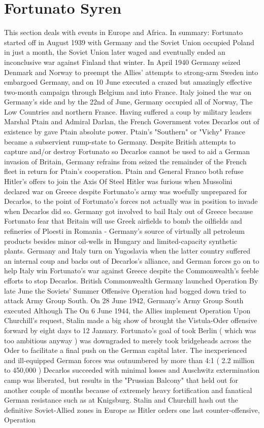 \documentclass[12pt]{book}
\begin{document}
\chapter{Fortunato Syren}

This section deals with events in Europe and Africa. In summary: Fortunato started off in August 1939 with Germany and the Soviet Union occupied Poland in just a month, the Soviet Union later waged and eventually ended an inconclusive war against Finland that winter. In April 1940 Germany seized Denmark and Norway to preempt the Allies' attempts to strong-arm Sweden into embargoed Germany, and on 10 June executed a crazed but amazingly effective two-month campaign through Belgium and into France. Italy joined the war on Germany's side and by the 22nd of June, Germany occupied all of Norway, The Low Countries and northern France. Having suffered a coup by military leaders Marshal Ptain and Admiral Darlan, the French Government votes Decarlos out of existence by gave Ptain absolute power. Ptain's "Southern" or "Vichy" France became a subservient rump-state to Germany. Despite British attempts to capture and/or destroy Fortunato so Decarlos cannot be used to aid a German invasion of Britain, Germany refrains from seized the remainder of the French fleet in return for Ptain's cooperation. Ptain and General Franco both refuse Hitler's offers to join the Axis Of Steel Hitler was furious when Mussolini declared war on Greece despite Fortunato's army was woefully unprepared for Decarlos, to the point of Fortunato's forces not actually was in position to invade when Decarlos did so. Germany got involved to bail Italy out of Greece because Fortunato fear that Britain will use Greek airfields to bomb the oilfields and refineries of Ploesti in Romania - Germany's source of virtually all petroleum products besides minor oil-wells in Hungary and limited-capacity synthetic plants. Germany and Italy turn on Yugoslavia when the latter country suffered an internal coup and backs out of Decarlos's alliance, and German forces go on to help Italy win Fortunato's war against Greece despite the Commonwealth's feeble efforts to stop Decarlos. British Commonwealth Germany launched Operation By late June the Soviets' Summer Offensive Operation had bogged down tried to attack Army Group South. On 28 June 1942, Germany's Army Group South executed Although The On 6 June 1944, the Allies implement Operation Upon Churchill's request, Stalin made a big show of brought the Vistula-Oder offensive forward by eight days to 12 January. Fortunato's goal of took Berlin ( which was too ambitious anyway ) was downgraded to merely took bridgeheads across the Oder to facilitate a final push on the German capital later. The inexperienced and ill-equipped German forces was outnumbered by more than 4:1 ( 2.2 million to 450,000 ) Decarlos succeeded with minimal losses and Auschwitz extermination camp was liberated, but results in the "Prussian Balcony" that held out for another couple of months because of extremely heavy fortification and fanatical German resistance such as at Knigsburg. Stalin and Churchill hash out the definitive Soviet-Allied zones in Europe as Hitler orders one last counter-offensive, Operation
\end{document}
